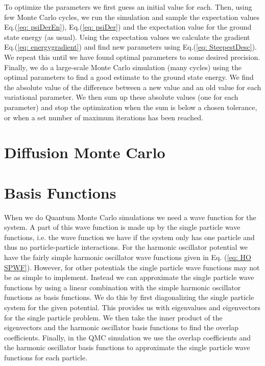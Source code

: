 \documentclass[../main.tex]{subfiles}
\begin{document}
To optimize the parameters we first guess an initial value for each. Then, using few Monte Carlo cycles, we run the simulation and sample the expectation values Eq.(\ref{eq: psiDerEn}), Eq.(\ref{eq: psiDer}) and the expectation value for the ground state energy (as usual). Using the expectation values we calculate the gradient Eq.(\ref{eq: energygradient}) and find new parameters using Eq.(\ref{eq: SteepestDesc}). We repeat this until we have found optimal parameters to some desired precision. Finally, we do a large-scale Monte Carlo simulation (many cycles) using the optimal parameters to find a good estimate to the ground state energy. We find the absolute value of the difference between a new value and an old value for each variational parameter. We then sum up these absolute values (one for each parameter) and stop the optimization when the sum is below a chosen tolerance, or when a set number of maximum iterations has been reached.



\section{Diffusion Monte Carlo}

\section{Basis Functions}

When we do Quantum Monte Carlo simulations we need a wave function for the system. A part of this wave function is made up by the single particle wave functions, i.e. the wave function we have if the system only has one particle and thus no particle-particle interactions. For the harmonic oscillator potential we have the fairly simple harmonic oscillator wave functions given in Eq. (\ref{eq: HO SPWF}). However, for other potentials the single particle wave functions may not be as simple to implement. Instead we can approximate the single particle wave functions by using a linear combination with the simple harmonic oscillator functions as basis functions. We do this by first diagonalizing the single particle system for the given potential. This provides us with eigenvalues and eigenvectors for the single particle problem. We then take the inner product of the eigenvectors and the harmonic oscillator basis functions to find the overlap coefficients. Finally, in the QMC simulation we use the overlap coefficients and the harmonic oscillator basis functions to approximate the single particle wave functions for each particle.
\end{document}
